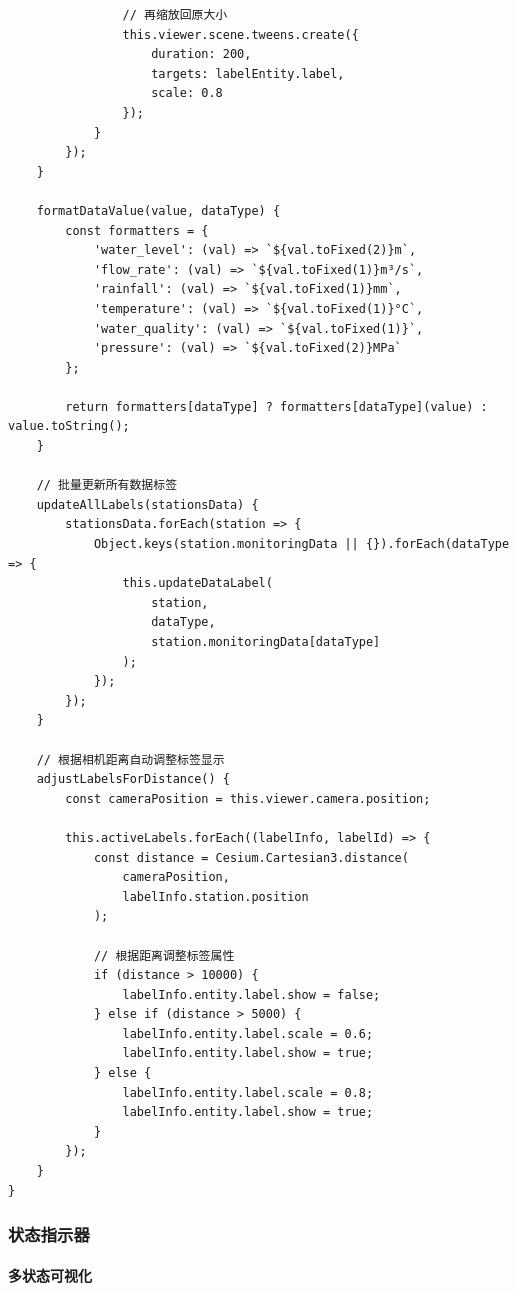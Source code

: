 \begin{lstlisting}
                // 再缩放回原大小
                this.viewer.scene.tweens.create({
                    duration: 200,
                    targets: labelEntity.label,
                    scale: 0.8
                });
            }
        });
    }
    
    formatDataValue(value, dataType) {
        const formatters = {
            'water_level': (val) => `${val.toFixed(2)}m`,
            'flow_rate': (val) => `${val.toFixed(1)}m³/s`,
            'rainfall': (val) => `${val.toFixed(1)}mm`,
            'temperature': (val) => `${val.toFixed(1)}°C`,
            'water_quality': (val) => `${val.toFixed(1)}`,
            'pressure': (val) => `${val.toFixed(2)}MPa`
        };
        
        return formatters[dataType] ? formatters[dataType](value) : value.toString();
    }
    
    // 批量更新所有数据标签
    updateAllLabels(stationsData) {
        stationsData.forEach(station => {
            Object.keys(station.monitoringData || {}).forEach(dataType => {
                this.updateDataLabel(
                    station,
                    dataType,
                    station.monitoringData[dataType]
                );
            });
        });
    }
    
    // 根据相机距离自动调整标签显示
    adjustLabelsForDistance() {
        const cameraPosition = this.viewer.camera.position;
        
        this.activeLabels.forEach((labelInfo, labelId) => {
            const distance = Cesium.Cartesian3.distance(
                cameraPosition,
                labelInfo.station.position
            );
            
            // 根据距离调整标签属性
            if (distance > 10000) {
                labelInfo.entity.label.show = false;
            } else if (distance > 5000) {
                labelInfo.entity.label.scale = 0.6;
                labelInfo.entity.label.show = true;
            } else {
                labelInfo.entity.label.scale = 0.8;
                labelInfo.entity.label.show = true;
            }
        });
    }
}
\end{lstlisting}

\subsubsection{状态指示器}\label{ux72b6ux6001ux6307ux793aux5668}

\paragraph{多状态可视化}\label{ux591aux72b6ux6001ux53efux89c6ux5316}

